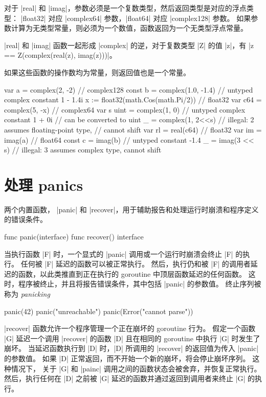 对于 \code|real| 和 \code|imag|，参数必须是一个复数类型，然后返回类型是对应的浮点类型：
\code|float32| 对应 \code|complex64| 参数，\code|float64| 对应 \code|complex128| 参数。
如果参数计算为无类型常量，则必须为一个数值，函数返回为一个无类型浮点常量。

\code|real| 和 \code|imag| 函数一起形成 \code|complex| 的逆，对于复数类型 \code|Z| 的值 \code|z|，有 \code|z == Z(complex(real(z), imag(z)))|。

如果这些函数的操作数均为常量，则返回值也是一个常量。

\begin{golang}
var a = complex(2, -2)             // complex128
const b = complex(1.0, -1.4)       // untyped complex constant 1 - 1.4i
x := float32(math.Cos(math.Pi/2))  // float32
var c64 = complex(5, -x)           // complex64
var s uint = complex(1, 0)         // untyped complex constant 1 + 0i 
								   // can be converted to uint
_ = complex(1, 2<<s)               // illegal: 2 assumes floating-point type, 
								   // cannot shift
var rl = real(c64)                 // float32
var im = imag(a)                   // float64
const c = imag(b)                  // untyped constant -1.4
_ = imag(3 << s)                   // illegal: 3 assumes complex type, cannot shift
\end{golang}

\section{处理 panics}
两个内置函数， \code|panic| 和 \code|recover|，用于辅助报告和处理运行时崩溃和程序定义的错误条件。
\begin{golang}
func panic(interface{})
func recover() interface{}
\end{golang}
当执行函数 \code|F| 时，一个显式的 \code|panic| 调用或一个运行时崩溃会终止 \code|F| 的执行。
任何被 \code|F| 延迟的函数可以被正常执行。
然后，执行仍和被 \code|F| 的调用者延迟的函数，以此类推直到正在执行的 goroutine 中顶层函数延迟的任何函数。
这时，程序被终止，并且将报告错误条件，其中包括 \code|panic| 的参数值。
终止序列被称为 \emph{panicking}
\begin{golang}
panic(42)
panic("unreachable")
panic(Error("cannot parse"))
\end{golang}

\code|recover| 函数允许一个程序管理一个正在崩坏的 goroutine 行为。
假定一个函数 \code|G| 延迟一个调用 \code|recover| 的函数 \code|D| 且在相同的 goroutine 中执行 \code|G| 时发生了崩坏。
当延迟函数执行到 \code|D| 时，\code|D| 所调用的 \code|recover| 的返回值为传入 \code|panic| 的参数值。
如果 \code|D| 正常返回，而不开始一个新的崩坏，将会停止崩坏序列。
这种情况下， 关于 \code|G| 和 \code|painc| 调用之间的函数状态会被舍弃，并恢复正常执行。
然后，执行任何在 \code|D| 之前被 \code|G| 延迟的函数并通过返回到调用者来终止 \code|G| 的执行。

